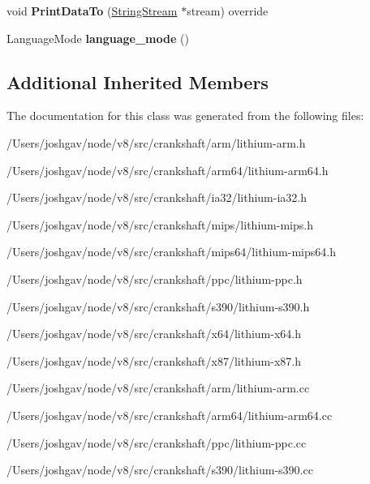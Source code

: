 \begin{DoxyCompactItemize}
\item 
void {\bfseries Print\+Data\+To} (\hyperlink{classv8_1_1internal_1_1_string_stream}{String\+Stream} $\ast$stream) override\hypertarget{classv8_1_1internal_1_1_l_store_keyed_generic_ab0d8e8441ce3f1b71da8ce0ccf807df8}{}\label{classv8_1_1internal_1_1_l_store_keyed_generic_ab0d8e8441ce3f1b71da8ce0ccf807df8}

\item 
Language\+Mode {\bfseries language\+\_\+mode} ()\hypertarget{classv8_1_1internal_1_1_l_store_keyed_generic_a279b2804fdca1b8181ce7a4b2e7a0d88}{}\label{classv8_1_1internal_1_1_l_store_keyed_generic_a279b2804fdca1b8181ce7a4b2e7a0d88}

\end{DoxyCompactItemize}
\subsection*{Additional Inherited Members}


The documentation for this class was generated from the following files\+:\begin{DoxyCompactItemize}
\item 
/\+Users/joshgav/node/v8/src/crankshaft/arm/lithium-\/arm.\+h\item 
/\+Users/joshgav/node/v8/src/crankshaft/arm64/lithium-\/arm64.\+h\item 
/\+Users/joshgav/node/v8/src/crankshaft/ia32/lithium-\/ia32.\+h\item 
/\+Users/joshgav/node/v8/src/crankshaft/mips/lithium-\/mips.\+h\item 
/\+Users/joshgav/node/v8/src/crankshaft/mips64/lithium-\/mips64.\+h\item 
/\+Users/joshgav/node/v8/src/crankshaft/ppc/lithium-\/ppc.\+h\item 
/\+Users/joshgav/node/v8/src/crankshaft/s390/lithium-\/s390.\+h\item 
/\+Users/joshgav/node/v8/src/crankshaft/x64/lithium-\/x64.\+h\item 
/\+Users/joshgav/node/v8/src/crankshaft/x87/lithium-\/x87.\+h\item 
/\+Users/joshgav/node/v8/src/crankshaft/arm/lithium-\/arm.\+cc\item 
/\+Users/joshgav/node/v8/src/crankshaft/arm64/lithium-\/arm64.\+cc\item 
/\+Users/joshgav/node/v8/src/crankshaft/ppc/lithium-\/ppc.\+cc\item 
/\+Users/joshgav/node/v8/src/crankshaft/s390/lithium-\/s390.\+cc\end{DoxyCompactItemize}
